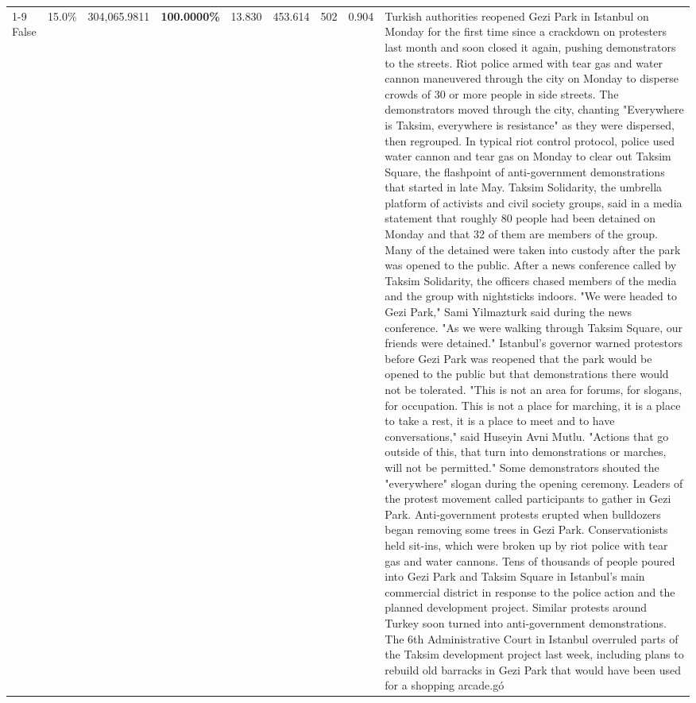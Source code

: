 \begin{table}[H]
\begin{tabular}{lllrlllll}
\cline{1-9}
False & 15.0\% & \color{red} 304,065.9811 & \bfseries \color{red} 100.0000\% & 13.830 & 453.614 & 502 & 0.904 & Turkish authorities reopened Gezi Park in Istanbul on Monday for the first time since a crackdown on protesters last month and soon closed it again, pushing demonstrators to the streets. Riot police armed with tear gas and water cannon maneuvered through the city on Monday to disperse crowds of 30 or more people in side streets. The demonstrators moved through the city, chanting "Everywhere is Taksim, everywhere is resistance" as they were dispersed, then regrouped. In typical riot control protocol, police used water cannon and tear gas on Monday to clear out Taksim Square, the flashpoint of anti-government demonstrations that started in late May. Taksim Solidarity, the umbrella platform of activists and civil society groups, said in a media statement that roughly 80 people had been detained on Monday and that 32 of them are members of the group. Many of the detained were taken into custody after the park was opened to the public. After a news conference called by Taksim Solidarity, the officers chased members of the media and the group with nightsticks indoors. "We were headed to Gezi Park," Sami Yilmazturk said during the news conference. "As we were walking through Taksim Square, our friends were detained." Istanbul's governor warned protestors before Gezi Park was reopened that the park would be opened to the public but that demonstrations there would not be tolerated. "This is not an area for forums, for slogans, for occupation. This is not a place for marching, it is a place to take a rest, it is a place to meet and to have conversations," said Huseyin Avni Mutlu. "Actions that go outside of this, that turn into demonstrations or marches, will not be permitted." Some demonstrators shouted the "everywhere" slogan during the opening ceremony. Leaders of the protest movement called participants to gather in Gezi Park. Anti-government protests erupted when bulldozers began removing some trees in Gezi Park. Conservationists held sit-ins, which were broken up by riot police with tear gas and water cannons. Tens of thousands of people poured into Gezi Park and Taksim Square in Istanbul's main commercial district in response to the police action and the planned development project. Similar protests around Turkey soon turned into anti-government demonstrations. The 6th Administrative Court in Istanbul overruled parts of the Taksim development project last week, including plans to rebuild old barracks in Gezi Park that would have been used for a shopping arcade.gó \\

\end{tabular}
\end{table}
